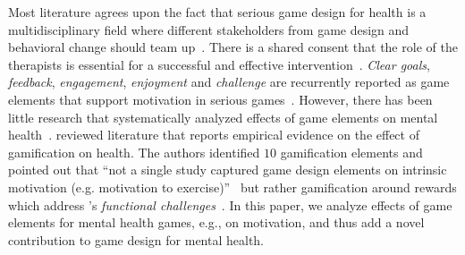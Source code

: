 
Most literature agrees upon the fact that serious game design for health is a multidisciplinary field where different stakeholders from game design and behavioral change should team up~\cite{cheek2015, fleming2016, thompson2010}.
There is a shared consent that the role of the therapists is essential for a successful and effective intervention~\cite{cheek2015,fleming2016}.
\textit{Clear goals}, \textit{feedback}, \textit{engagement}, \textit{enjoyment} and \textit{challenge} are recurrently reported as game elements that support motivation in serious games~\cite{fenn2013,fleming2017,guillen-nieto2012,thompson2010}.
However, there has been little research that systematically analyzed effects of game elements on mental health~\cite{birk2019}. 
\citeauthor{johnson2016} reviewed literature that reports empirical evidence on the effect of gamification on health. The authors identified $10$ gamification elements and pointed out that ``not a single study captured game design elements on intrinsic motivation (e.g. motivation to exercise)''~\cite{johnson2016} but rather gamification around rewards which address \citeauthor{cole2015}'s \textit{functional challenges}~\cite{cole2015}. In this paper, we analyze effects of game elements for mental health games, e.g., on motivation, and thus add a novel contribution to game design for mental health.

